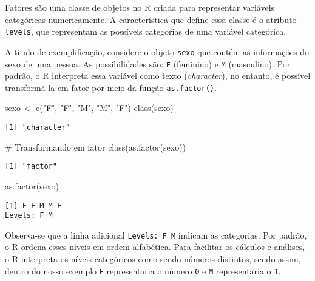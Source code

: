 \documentclass[
  12pt,
  letterpaper,
  DIV=11,
  numbers=noendperiod]{scrreprt}
\newenvironment{Shaded}{\begin{snugshade}}{\end{snugshade}}
\newcommand{\CommentTok}[1]{\textcolor[rgb]{0.37,0.37,0.37}{#1}}
\newcommand{\FunctionTok}[1]{\textcolor[rgb]{0.28,0.35,0.67}{#1}}
\newcommand{\NormalTok}[1]{\textcolor[rgb]{0.00,0.23,0.31}{#1}}
\newcommand{\OtherTok}[1]{\textcolor[rgb]{0.00,0.23,0.31}{#1}}
\newcommand{\StringTok}[1]{\textcolor[rgb]{0.13,0.47,0.30}{#1}}
\begin{document}
Fatores são uma classe de objetos no R criada para representar variáveis
categóricas numericamente. A característica que define essa classe é o
atributo \texttt{levels}, que representam as possíveis categorias de uma
variável categórica.

A título de exemplificação, considere o objeto \texttt{sexo} que contém
as informações do sexo de uma pessoa. As possibilidades são: \texttt{F}
(feminino) e \texttt{M} (masculino). Por padrão, o R interpreta essa
variável como texto (\emph{character}), no entanto, é possível
transformá-la em fator por meio da função \texttt{as.factor()}.

\begin{Shaded}
\begin{Highlighting}[]
\NormalTok{sexo }\OtherTok{\textless{}{-}} \FunctionTok{c}\NormalTok{(}\StringTok{"F"}\NormalTok{, }\StringTok{"F"}\NormalTok{, }\StringTok{"M"}\NormalTok{, }\StringTok{"M"}\NormalTok{, }\StringTok{"F"}\NormalTok{)}
\FunctionTok{class}\NormalTok{(sexo)}
\end{Highlighting}
\end{Shaded}

\begin{verbatim}
[1] "character"
\end{verbatim}

\begin{Shaded}
\begin{Highlighting}[]
\CommentTok{\# Transformando em fator}
\FunctionTok{class}\NormalTok{(}\FunctionTok{as.factor}\NormalTok{(sexo))}
\end{Highlighting}
\end{Shaded}

\begin{verbatim}
[1] "factor"
\end{verbatim}

\begin{Shaded}
\begin{Highlighting}[]
\FunctionTok{as.factor}\NormalTok{(sexo)}
\end{Highlighting}
\end{Shaded}

\begin{verbatim}
[1] F F M M F
Levels: F M
\end{verbatim}

\noindent Observa-se que a linha adicional \texttt{Levels:\ F\ M}
indicam as categorias. Por padrão, o R ordena esses níveis em ordem
alfabética. Para facilitar os cálculos e análises, o R interpreta os
níveis categóricos como sendo números distintos, sendo assim, dentro do
nosso exemplo \texttt{F} representaria o número \texttt{0} e \texttt{M}
representaria o \texttt{1}.
\end{document}
